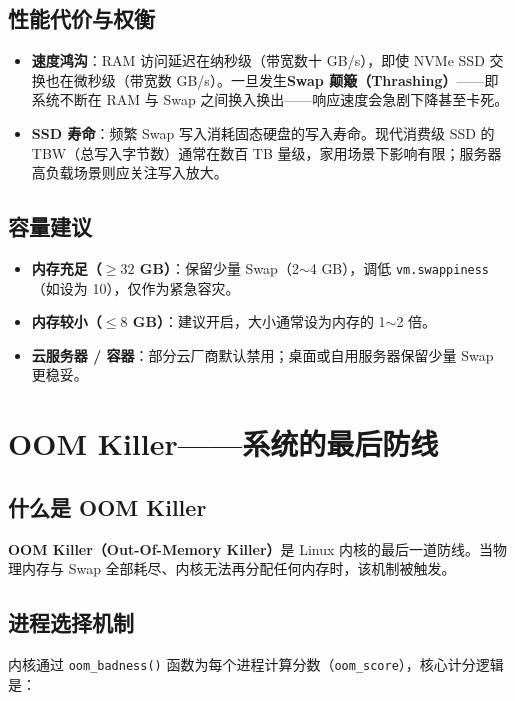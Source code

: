 \section{性能代价与权衡}

\begin{itemize}[leftmargin=2cm]
	\item \textbf{速度鸿沟}：RAM 访问延迟在纳秒级（带宽数十 GB/s），即使 NVMe SSD 交换也在微秒级（带宽数 GB/s）。一旦发生\textbf{Swap 颠簸（Thrashing）}——即系统不断在 RAM 与 Swap 之间换入换出——响应速度会急剧下降甚至卡死。
	\item \textbf{SSD 寿命}：频繁 Swap 写入消耗固态硬盘的写入寿命。现代消费级 SSD 的 TBW（总写入字节数）通常在数百 TB 量级，家用场景下影响有限；服务器高负载场景则应关注写入放大。
\end{itemize}

\section{容量建议}

\begin{itemize}[leftmargin=2cm]
	\item \textbf{内存充足（$\ge 32$ GB）}：保留少量 Swap（2$\sim$4 GB），调低 \texttt{vm.swappiness}（如设为 10），仅作为紧急容灾。
	\item \textbf{内存较小（$\le 8$ GB）}：建议开启，大小通常设为内存的 1$\sim$2 倍。
	\item \textbf{云服务器 / 容器}：部分云厂商默认禁用；桌面或自用服务器保留少量 Swap 更稳妥。
\end{itemize}


\chapter{OOM Killer——系统的最后防线}

\section{什么是 OOM Killer}

\textbf{OOM Killer（Out-Of-Memory Killer）}是 Linux 内核的最后一道防线。当物理内存与 Swap 全部耗尽、内核无法再分配任何内存时，该机制被触发。

\section{进程选择机制}

内核通过 \texttt{oom\_badness()} 函数为每个进程计算分数（\texttt{oom\_score}），核心计分逻辑是：

